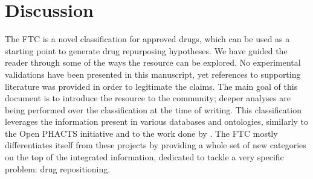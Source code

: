 \documentclass{bioinfo}
\begin{document}
\section{Discussion}

The FTC is a novel classification for approved drugs, which can be used as a starting point to 
generate drug repurposing hypotheses. We have guided the reader through some of the ways the resource 
can be explored. No experimental validations have been presented in this manuscript, yet references to 
supporting literature was provided in order to legitimate the claims. The main goal of this document is to 
introduce the resource to the community; deeper analyses are being performed over the classification at the time of writing.
This classification leverages the information present in various databases and ontologies, similarly to the 
Open PHACTS initiative \citep{williams2012open} and to the work done by \cite{hoehndorf2012identifying}. The FTC
mostly differentiates itself from these projects by providing a whole set of new categories on the top of the integrated
information, dedicated to tackle a very specific problem: drug repositioning.
\end{document}
